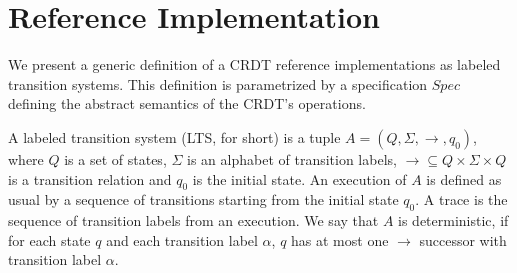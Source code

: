 
\section{Reference Implementation}
\label{sec:reference implementation}


We present a generic definition of a CRDT reference implementations as labeled transition systems. This definition is parametrized by a specification $Spec$ defining the abstract semantics of the CRDT's operations.

A labeled transition system (LTS, for short) is a tuple $A = (Q,\Sigma,\rightarrow,q_0)$, where $Q$ is a set of states, $\Sigma$ is an alphabet of transition labels, $\rightarrow \subseteq Q \times \Sigma \times Q$ is a transition relation and $q_0$ is the initial state. An execution of $A$ is defined as usual by a sequence of transitions starting from the initial state $q_0$. A trace is the sequence of transition labels from an execution. We say that $A$ is deterministic, if for each state $q$ and each transition label $\alpha$, $q$ has at most one $\rightarrow$ successor with transition label $\alpha$.


